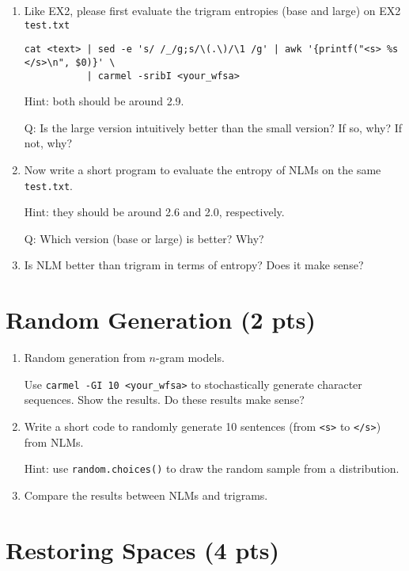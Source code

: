 \documentclass{article}
\begin{document}
\begin{enumerate}
\item Like EX2, please first evaluate the trigram entropies (base and large) on EX2 \verb|test.txt|

\begin{verbatim}
cat <text> | sed -e 's/ /_/g;s/\(.\)/\1 /g' | awk '{printf("<s> %s </s>\n", $0)}' \
           | carmel -sribI <your_wfsa>
\end{verbatim} 

Hint: both should be around 2.9. 

Q: Is the large version intuitively better than the small version? If so, why? If not, why?

\item Now write a short program to evaluate the entropy of NLMs on the same \verb|test.txt|.

Hint: they should be around 2.6 and 2.0, respectively. 

Q: Which version (base or large) is better? Why?

\item Is NLM better than trigram in terms of entropy? Does it make sense?
\end{enumerate}


\section{Random Generation (2 pts)}

\begin{enumerate}
\item Random generation from $n$-gram models.

Use \verb|carmel -GI 10 <your_wfsa>| to stochastically generate
character sequences. Show the results.
Do these results make sense?

\item Write a short code to randomly generate 10 sentences (from \verb|<s>| to \verb|</s>|) from NLMs.

Hint: use \verb|random.choices()| to draw the random sample from a distribution.

\item Compare the results between NLMs and trigrams.

\end{enumerate}

\section{Restoring Spaces (4 pts)}
\end{document}
